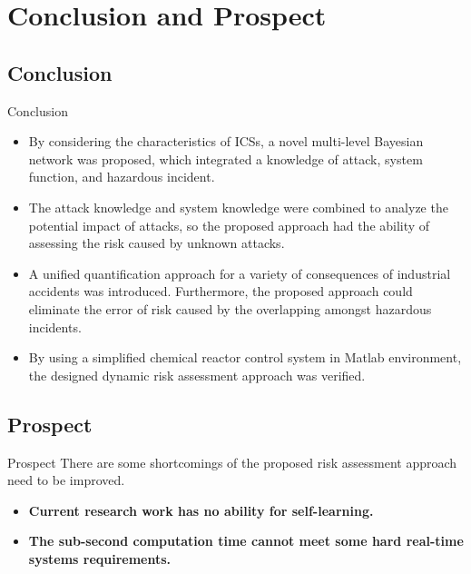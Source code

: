 \section{Conclusion and Prospect}
\subsection{Conclusion}
\begin{frame}{Conclusion}
\begin{itemize}[<+->]
  \item By considering the characteristics of ICSs, a novel multi-level Bayesian network was proposed, which integrated a knowledge of attack, system function, and hazardous incident.
  \item The attack knowledge and system knowledge were combined to analyze the potential impact of attacks, so the proposed approach had the ability of assessing the risk caused by unknown attacks.
  \item A unified quantification approach for a variety of consequences of industrial accidents was introduced. Furthermore, the proposed approach could eliminate the error of risk caused by the overlapping amongst hazardous incidents.
  \item By using a simplified chemical reactor control system in Matlab environment, the designed dynamic risk assessment approach was verified.
\end{itemize}
\end{frame}

\subsection{Prospect}
\begin{frame}{Prospect}
    There are some shortcomings of the proposed risk assessment approach need to be improved.
    \begin{itemize}[<+->]
      \item \textbf{Current research work has no ability for self-learning.} 
      \item \textbf{The sub-second computation time cannot meet some hard real-time systems requirements.}
    \end{itemize}
\end{frame}
